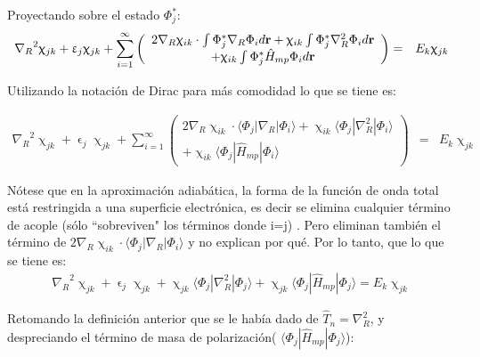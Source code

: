 \documentclass [11pt]{article}
\begin{document}
Proyectando sobre el estado $\Phi_j^*$:
\begin{eqnarray*}
    {\nabla_R}^2\upchi_{jk}+\upvarepsilon_j \upchi_{jk}+\sum_{i=1}^{\infty}\left(
    \begin{array}{cc}
         2{\nabla_R}\upchi_{ik}\cdot\int \Phi_j^*{\nabla_R}\Phi_i d{\bf r}+\upchi_{ik}\int \Phi_j^*{\nabla_R^2}\Phi_i d{\bf r}\\
         +\upchi_{ik}\int \Phi_j^*{\hat H}_{mp}\Phi_id{\bf r}
    \end{array}\right) & = & E_k\upchi_{jk}
\end{eqnarray*}

Utilizando la notación de Dirac para más comodidad lo que se tiene es:

\begin{eqnarray*}
    {\nabla_R}^2\upchi_{jk}+\upvarepsilon_j \upchi_{jk}+\sum_{i=1}^{\infty}\left(
    \begin{array}{cc}
         2{\nabla_R}\upchi_{ik}\cdot\langle\Phi_j|\nabla_R|\Phi_i\rangle+\upchi_{ik}\langle\Phi_j|{\nabla_R^2}|\Phi_i\rangle\\
         +\upchi_{ik}\langle\Phi_j|{\hat H}_{mp}|\Phi_i\rangle
    \end{array}\right) & = & E_k\upchi_{jk}
\end{eqnarray*}

Nótese que en la aproximación adiabática, la forma de la función de onda total está restringida a una superficie electrónica, es decir se elimina cualquier término de acople (sólo ``sobreviven" los términos donde i=j) \cite{jensen}. {\color{red} Pero eliminan también el término de $2{\nabla_R}\upchi_{ik}\cdot\langle\Phi_j|\nabla_R|\Phi_i\rangle$ y no explican por qué}. Por lo tanto, que lo que se tiene es:
\begin{eqnarray*}
    {\nabla_R}^2\upchi_{jk}+\upvarepsilon_j \upchi_{jk}+\upchi_{jk}\langle\Phi_j|{\nabla_R^2}|\Phi_j\rangle+\upchi_{jk}\langle\Phi_j|{\hat H}_{mp}|\Phi_j\rangle =  E_k\upchi_{jk}
\end{eqnarray*}

Retomando la definición anterior que se le había dado de $\hat T_n=\nabla_R^2$, y despreciando el término de masa de polarización( $\langle\Phi_j|{\hat H}_{mp}|\Phi_j\rangle$):
\end{document}
